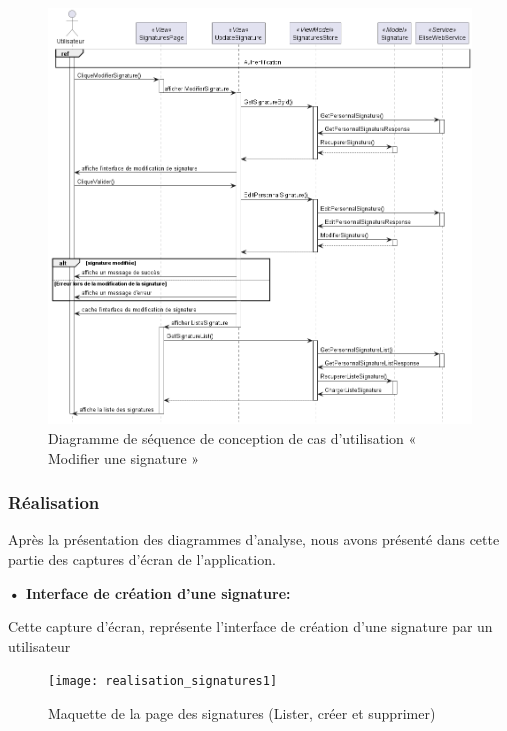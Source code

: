 \begin{figure}[H]
  \centering
  \includegraphics[width=1\textwidth]{out/diagrams/signatures/sequence_update/sequence_update_signature}
  \caption{Diagramme de séquence de conception de cas d'utilisation « Modifier une signature  »}
  \label{fig:sequence_conception_update_signature}
\end{figure}





\subsubsection{Réalisation}

Après la présentation des diagrammes d'analyse, nous avons présenté dans cette partie des captures d'écran de l'application.

\textbf{•	Interface de création d'une signature:}

Cette capture d'écran, représente l'interface de création d'une signature par un utilisateur
\begin{figure}[H]
  \centering
  \texttt{[image: realisation\_signatures1]}
  \caption{Maquette de la page des signatures (Lister, créer et supprimer)}
  \label{fig:realisation_signatures}
\end{figure}

